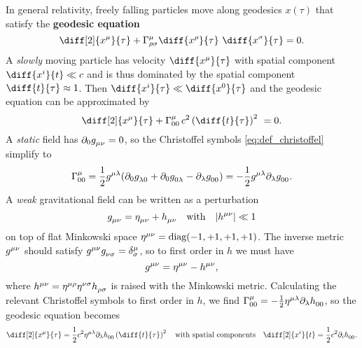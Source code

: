 In general relativity, freely falling particles move along geodesics $x(\tau)$ that satisfy the \textbf{geodesic equation}
\begin{equation}
	\diff[2]{x^\mu}{\tau} + \Gamma^\mu_{\rho \sigma} \diff{x^\rho}{\tau} \diff{x^\sigma}{\tau} = 0 .
	\label{eq:geodesic}
\end{equation}
A \emph{slowly} moving particle has velocity $\diff{x^\mu}{\tau}$ with spatial component $\diff{x^i}{t} \ll c$ and is thus dominated by the spatial component $\diff{t}{\tau} \approx 1$.
Then $\diff{x^i}{\tau} \ll \diff{x^0}{\tau}$ and the geodesic equation can be approximated by
\begin{equation*}
	\diff[2]{x^\mu}{\tau} + \Gamma^\mu_{00} \, c^2 \left( \diff{t}{\tau} \right)^2 = 0 .
\end{equation*}
A \emph{static} field has $\partial_0 g\indices{_\mu_\nu} = 0$, so the Christoffel symbols \eqref{eq:def_christoffel} simplify to
\begin{equation*}
	\Gamma^\mu_{00} = \frac{1}{2} g\indices{^\mu^\lambda} (\partial_0 g\indices{_\lambda_0} + \partial_0 g\indices{_0_\lambda} - \partial_\lambda g\indices{_0_0}) = -\frac{1}{2} g\indices{^\mu^\lambda} \partial_\lambda g\indices{_0_0} .
\end{equation*}
A \emph{weak} gravitational field can be written as a perturbation 
\begin{equation}
	g\indices{_\mu_\nu} = \eta\indices{_\mu_\nu} + h\indices{_\mu_\nu}
	\quad \text{with} \quad
	\abs{h\indices{^\mu^\nu}} \ll 1
	\label{eq:weak_field_limit:metric_perturbation}
\end{equation}
on top of flat Minkowski space $\eta\indices{^\mu^\nu} = \text{diag}(-1, +1, +1, +1)$.
The inverse metric $g\indices{^\mu^\nu}$ should satisfy $g\indices{^\mu^\nu} g\indices{_\nu_\sigma} = \delta^\mu_\sigma$, so to first order in $h$ we must have
\begin{equation*}
	g\indices{^\mu^\nu} = \eta\indices{^\mu^\nu} - h\indices{^\mu^\nu} ,
\end{equation*}
where $h\indices{^\mu^\nu} = \eta\indices{^\mu^\rho} \eta\indices{^\nu^\sigma} h\indices{_\rho_\sigma}$ is raised with the Minkowski metric.
Calculating the relevant Christoffel symbols to first order in $h$, we find $\Gamma^\mu_{00} = -\frac{1}{2} \eta\indices{^\mu^\lambda} \partial_\lambda h\indices{_0_0}$, so the geodesic equation becomes
\begin{equation*}
	\diff[2]{x^\mu}{\tau} = \frac{1}{2} c^2 \eta\indices{^\mu^\lambda} \partial_\lambda h\indices{_0_0} \left( \diff{t}{\tau} \right)^2
	\quad \text{with spatial components} \quad
	\diff[2]{x^i}{t} = \frac{1}{2} c^2 \partial_i h\indices{_0_0} .
\end{equation*}

